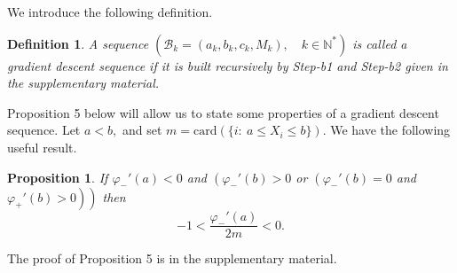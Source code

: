 \documentclass[
  11pt,
  a4paper,
]{article}
\newcommand\N{{\mathbb N}}
\newtheorem{definition}{Definition}
\newtheorem{proposition}{Proposition}
\begin{document}
We introduce the following definition.    
\begin{definition}
	A sequence $\left(\mathscr{B}_k=\left(a_k,b_k,c_k,M_k \right),\quad k\in \N^*\right)$ is called a gradient descent 
	sequence if it is built recursively by  Step-b1  and  Step-b2 given in the supplementary material.
\end{definition}    



Proposition 5 below will allow us to state some properties of a gradient descent sequence.
Let $a<b,$ and set $m=\mathrm{card}(\{i:\ a\leq X_i\leq b\})$. We have the following useful result.

\begin{proposition} If $\varphi_{-}'(a)<0$ and $\left(\varphi_{-}'(b)>0\right.$ or 
	$\left( \varphi_{-}'(b)=0 \right.$ and $\left.\left.\varphi_{+}'(b)>0\right)\right)$ then
	\[
	-1<\frac{\varphi_{-}'(a)}{2m}<0.
	\]
\end{proposition}
The proof of Proposition 5 is in the supplementary material.
\end{document}
